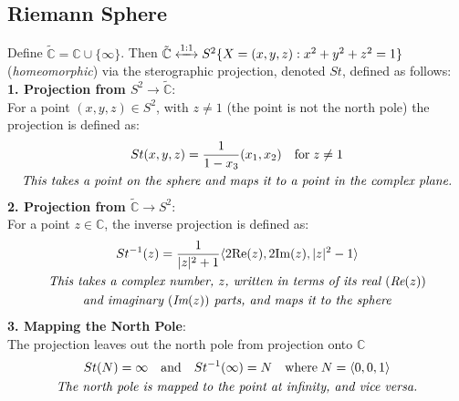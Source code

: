\documentclass[a4paper, 10pt ]{article} %
\theoremstyle{definition}
\theoremstyle{plain}
\begin{document}
\subsection{Riemann Sphere}
Define $\tilde{\mathbb{C}} = \mathbb{C} \cup \{\infty\}$. Then $\tilde{\mathbb{C}} \xleftrightarrow{1:1} S^2 \{X = (x,y,z) : x^2 + y^2 + z^2 = 1 \}$ (\emph{homeomorphic}) via the sterographic projection, denoted $St$, defined as follows:\\[2ex]
\textbf{1. Projection from $S^2 \to \tilde{\mathbb{C}}$}: \\
For a point $(x, y,z ) \in S^2$, with $z \neq 1$ (the point is not the north pole) the projection is defined as:
\begin{gather}
  St(x, y, z) = \frac{1}{1-x_3}(x_1, x_2) \quad \text{for} \; z \neq 1 \notag \\
  \text{\emph{This takes a point on the sphere and maps it to a point in the complex plane.}} \notag
\end{gather}
\textbf{2. Projection from $\tilde{\mathbb{C}} \to S^2$}: \\
For a point $z \in \mathbb{C}$, the inverse projection is defined as:
\begin{gather}
  St^{-1}(z) = \frac{1}{|z|^2 + 1}\langle 2\text{Re}(z), 2\text{Im}(z), |z|^2 - 1 \rangle \notag  \\
  \text{\emph{This takes a complex number, $z$, written in terms of its real $($Re$(z))$}} \notag \\
  \text{\emph{and imaginary $($Im$(z))$ parts, and maps it to the sphere}} \notag
\end{gather}
\textbf{3. Mapping the North Pole}:
\\The projection leaves out the north pole from projection onto $\mathbb{C}$
\begin{gather}
  St(N)= \infty \quad \text{and} \quad St^{-1}(\infty) = N \notag \quad \text{where}\; N = \langle 0,0,1\rangle\\
  \text{\emph{The north pole is mapped to the point at infinity, and vice versa.}} \notag
\end{gather}

\pagebreak
\end{document}
